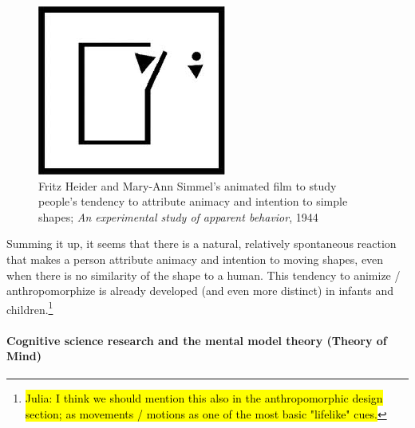 \documentclass{frontiersSCNS} %
\begin{document}
\begin{figure}[h]\centering
  \includegraphics[scale=0.6]{heider-simmel_animation.jpeg}
 \caption{Fritz Heider and Mary-Ann Simmel's animated film to study people's tendency to attribute animacy and intention to simple shapes; \textit{An experimental study of apparent behavior}, 1944}
 \label{fig:animacy_attribution}       %
 \end{figure}

Summing it up, it seems that there is a natural, relatively spontaneous reaction that makes a person attribute animacy and intention to moving shapes, even when there is no similarity of the shape to a human. This tendency to animize / anthropomorphize is already developed (and even more distinct) in infants and children.\footnote{\hl{Julia: I think we should mention this also in the anthropomorphic design section; as movements / motions as one of the most basic "lifelike" cues.}}


\paragraph*{Cognitive science research and the mental model theory (Theory of Mind)\\}
\end{document}
